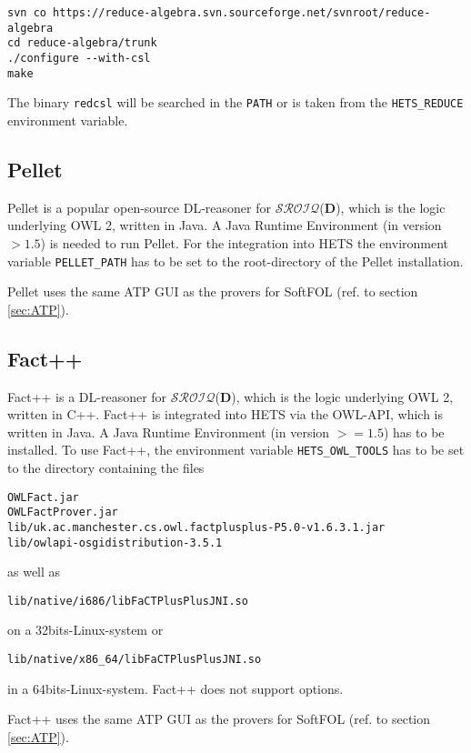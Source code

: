 \documentclass{article}
\newcommand{\normalTEXTSC}[2]{{#1\scriptsize#2}}
\newcommand     {\Hets}{\normalTEXTSC{H}{ETS}\xspace}
\newcommand{\SROIQ}{$\mathcal{SROIQ}$(\textbf{D})\xspace}
\newcommand{\DL}{DL\xspace}
\begin{document}
\begin{verbatim}
svn co https://reduce-algebra.svn.sourceforge.net/svnroot/reduce-algebra
cd reduce-algebra/trunk
./configure --with-csl
make
\end{verbatim}

The binary \texttt{redcsl} will be searched in the \texttt{PATH} or is taken
from the \texttt{HETS\_REDUCE} environment variable.

\subsection{Pellet}
Pellet is a popular open-source \DL-reasoner for \SROIQ, which is the logic
underlying OWL 2, written in Java. A Java Runtime Environment (in version $> 1.5$)
is needed to run Pellet. For the integration into \Hets the environment variable
\verb+PELLET_PATH+ has to be set to the root-directory of the Pellet installation.

Pellet uses the same ATP GUI as the provers for SoftFOL (ref. to section
\ref{sec:ATP}).
\subsection{Fact++}
Fact++ is a \DL-reasoner for \SROIQ, which is the logic underlying OWL 2, written in
C++. Fact++ is integrated into \Hets via the OWL-API, which is written in Java.
A Java Runtime Environment (in version $>= 1.5$) has to be installed. To use Fact++,
the environment variable \verb+HETS_OWL_TOOLS+ has to be set to the directory
containing the files
\begin{verbatim}
OWLFact.jar
OWLFactProver.jar
lib/uk.ac.manchester.cs.owl.factplusplus-P5.0-v1.6.3.1.jar
lib/owlapi-osgidistribution-3.5.1
\end{verbatim}
as well as
\begin{verbatim}
lib/native/i686/libFaCTPlusPlusJNI.so
\end{verbatim}
on a 32bits-Linux-system or
\begin{verbatim}
lib/native/x86_64/libFaCTPlusPlusJNI.so
\end{verbatim}
in a 64bits-Linux-system. Fact++ does not support options.

Fact++ uses the same ATP GUI as the provers for SoftFOL (ref. to section
\ref{sec:ATP}).
\end{document}

